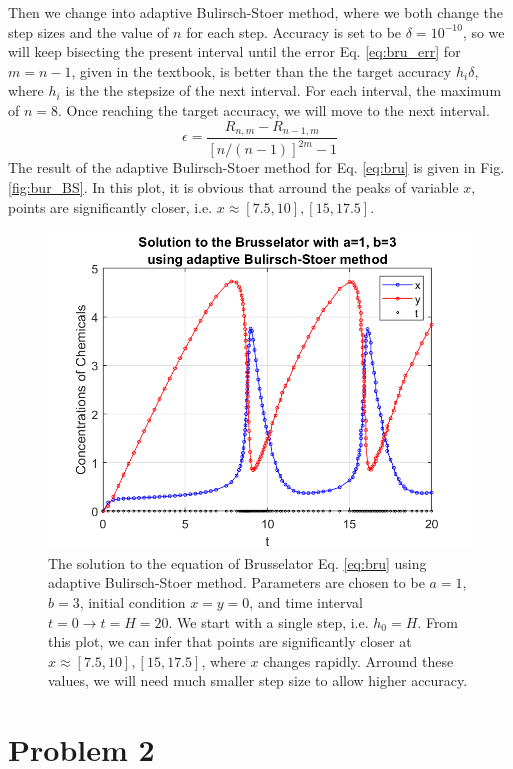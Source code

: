 \documentclass[12pt, graphicx]{article}
\begin{document}
Then we change into adaptive Bulirsch-Stoer method, where we both change the step sizes and the value of $n$ for each step. Accuracy is set to be $\delta=10^{-10}$, so we will keep bisecting the present interval until the error Eq. \ref{eq:bru_err} for $m=n-1$, given in the textbook, is better than the the target accuracy $h_i\delta$, where $h_i$ is the the stepsize of the next interval. For each interval, the maximum of $n=8$. Once reaching the target accuracy, we will move to the next interval.
\begin{equation}
\epsilon=\frac{R_{n,m}-R_{n-1,m}}{[n/(n-1)]^{2m}-1}
\label{eq:bru_err}
\end{equation}
The result of the adaptive Bulirsch-Stoer method for Eq. \ref{eq:bru} is given in Fig. \ref{fig:bur_BS}. In this plot, it is obvious that arround the peaks of variable $x$, points are significantly closer, i.e. $x\approx[7.5,10],[15,17.5]$. 

\begin{figure}[ht]
\centering
\includegraphics[width = 120mm]{Brusselator_BS.png}
\caption{The solution to the equation of Brusselator Eq. \ref{eq:bru} using adaptive Bulirsch-Stoer method. Parameters are chosen to be $a=1$, $b=3$, initial condition $x=y=0$, and time interval $t=0\to t=H=20$. We start with a single step, i.e. $h_0=H$. From this plot, we can infer that points are significantly closer at $x\approx[7.5,10],[15,17.5]$, where $x$ changes rapidly. Arround these values, we will need much smaller step size to allow higher accuracy.}
\label{fig:bru_BS}
\end{figure}

\section*{Problem 2}
\end{document}
